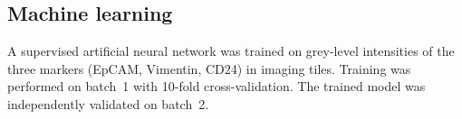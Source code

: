 \documentclass[11pt]{article}
\begin{document}
\subsection{Machine learning}
A supervised artificial neural network was trained on grey-level intensities of the three markers (EpCAM, Vimentin, CD24) in imaging tiles. Training was performed on batch~1 with 10-fold cross-validation. The trained model was independently validated on batch~2.


\end{document}
